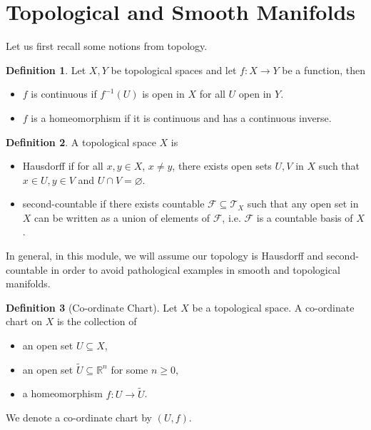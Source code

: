\documentclass[]{article}
\theoremstyle{definition}
\theoremstyle{definition}
\newtheorem{definition}{Definition}[section]
\begin{document}
\section{Topological and Smooth Manifolds}

Let us first recall some notions from topology.

\begin{definition}
  Let \(X, Y\) be topological spaces and let \(f : X \to Y\) be a function,
  then 
  \begin{itemize}
    \item \(f\) is continuous if \(f^{-1}(U)\) is open in \(X\) for all \(U\) open 
      in \(Y\).
    \item \(f\) is a homeomorphism if it is continuous and has a continuous inverse.
  \end{itemize}
\end{definition}

\begin{definition}
  A topological space \(X\) is 
  \begin{itemize}
    \item Hausdorff if for all \(x, y \in X\), \(x \neq y\), there exists open 
      sets \(U, V\) in \(X\) such that \(x \in U, y \in V\) and 
      \(U \cap V = \varnothing\).
    \item second-countable if there exists countable 
      \(\mathcal{F} \subseteq \mathcal{T}_X\) such that any open set in \(X\) 
      can be written as a union of elements of \(\mathcal{F}\), i.e. 
      \(\mathcal{F}\) is a countable basis of \(X\).
  \end{itemize}
\end{definition}

In general, in this module, we will assume our topology is Hausdorff and 
second-countable in order to avoid pathological examples in smooth and 
topological manifolds. 

\begin{definition}[Co-ordinate Chart]
  Let \(X\) be a topological space. A co-ordinate chart on \(X\) is 
  the collection of
  \begin{itemize}
    \item an open set \(U \subseteq X\),
    \item an open set \(\tilde U \subseteq \mathbb{R}^n\) for some \(n \ge 0\), 
    \item a homeomorphism \(f : U \to \tilde U\).
  \end{itemize}
  We denote a co-ordinate chart by \((U, f)\).
\end{definition}
\end{document}
